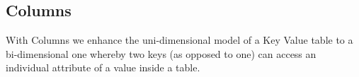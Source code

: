 


\subsection{Columns}
\label{sec:heimdall:columns}


With Columns we enhance the uni-dimensional model of a Key Value table  to a bi-dimensional one whereby two keys (as opposed to one) can access an individual attribute of a value inside a table.  

